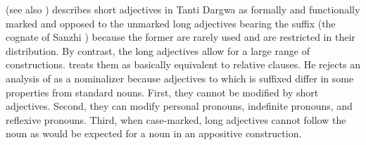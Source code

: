 \citet{Lander2014} (see also ) describes short adjectives in Tanti Dargwa as formally and functionally marked and opposed to the unmarked long adjectives bearing the suffix  (the cognate of Sanzhi ) because the former are rarely used and are restricted in their distribution. By contrast, the long adjectives allow for a large range of constructions. \citet{Lander2014} treats them as basically equivalent to relative clauses. He rejects an analysis of  as a nominalizer because adjectives to which  is suffixed differ in some properties from standard nouns. First, they cannot be modified by short adjectives. Second, they can modify personal pronouns, indefinite pronouns, and reflexive pronouns. Third, when case-marked, long adjectives cannot follow the noun as would be expected for a noun in an appositive construction.

